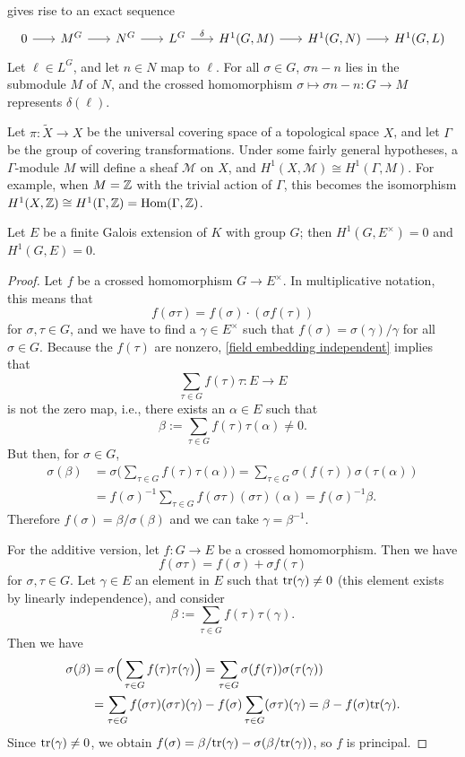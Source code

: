 gives rise to an exact sequence
\[\begin{tikzcd}[column sep=scriptsize]
0\ar[r]&M^G\ar[r]&N^G\ar[r]&L^G\ar[r,"\delta"]&H^1(G,M)\ar[r]&H^1(G,N)\ar[r]&H^1(G,L)
\end{tikzcd}\]
Let $\ell\in L^G$, and let $n\in N$ map to $\ell$. For all $\sigma\in G$, $\sigma n-n$ lies in the submodule $M$ of $N$, and the crossed homomorphism $\sigma\mapsto\sigma n-n:G\to M$ represents $\delta(\ell)$.
\begin{example}
Let $\pi:\widetilde{X}\to X$ be the universal covering space of a topological space $X$, and let $\Gamma$ be the group of covering transformations. Under some fairly general hypotheses, a $\Gamma$-module $M$ will define a sheaf $\mathcal{M}$ on $X$, and $H^1(X,\mathcal{M})\cong H^1(\Gamma,M)$. For example, when $M=\mathbb{Z}$ with the trivial action of $\Gamma$, this becomes the isomorphism $H^1(X,\mathbb{Z})\cong H^1(\Gamma,\mathbb{Z})=\mathrm{Hom}(\Gamma,\mathbb{Z})$.
\end{example}
\begin{theorem}\label{field ext H^1 is trivial}
Let $E$ be a finite Galois extension of $K$ with group $G$; then $H^1(G,E^{\times})=0$ and $H^1(G,E)=0$.
\end{theorem}
\begin{proof}
Let $f$ be a crossed homomorphism $G\to E^\times$. In multiplicative notation, this means that
\[f(\sigma\tau)=f(\sigma)\cdot (\sigma f(\tau))\]
for $\sigma,\tau\in G$, and we have to find a $\gamma\in E^\times$ such that $f(\sigma)=\sigma(\gamma)/\gamma$ for all $\sigma\in G$. Because the $f(\tau)$ are nonzero, \cref{field embedding independent} implies that
\[\sum_{\tau\in G}f(\tau)\tau:E\to E\]
is not the zero map, i.e., there exists an $\alpha\in E$ such that
\[\beta:=\sum_{\tau\in G}f(\tau)\tau(\alpha)\neq 0.\]
But then, for $\sigma\in G$,
\begin{align*}
\sigma(\beta)&=\sigma\Big(\sum_{\tau\in G}f(\tau)\tau(\alpha)\Big)=\sum_{\tau\in G}\sigma(f(\tau))\sigma(\tau(\alpha))\\
&=f(\sigma)^{-1}\sum_{\tau\in G}f(\sigma\tau)(\sigma\tau)(\alpha)=f(\sigma)^{-1}\beta.
\end{align*}
Therefore $f(\sigma)=\beta/\sigma(\beta)$ and we can take $\gamma=\beta^{-1}$.\par
For the additive version, let $f:G\to E$ be a crossed homomorphism. Then we have
\[f(\sigma\tau)=f(\sigma)+\sigma f(\tau)\]
for $\sigma,\tau\in G$. Let $\gamma\in E$ an element in $E$ such that $\mathrm{tr}(\gamma)\neq 0$ (this element exists by linearly independence), and consider
\[\beta:=\sum_{\tau\in G}f(\tau)\tau(\gamma).\]
Then we have
\begin{align*}
\sigma(\beta)&=\sigma\Big(\sum_{\tau\in G}f(\tau)\tau(\gamma)\Big)=\sum_{\tau\in G}\sigma(f(\tau))\sigma(\tau(\gamma))\\
&=\sum_{\tau\in G}f(\sigma\tau)(\sigma\tau)(\gamma)-f(\sigma)\sum_{\tau\in G}(\sigma\tau)(\gamma)=\beta-f(\sigma)\mathrm{tr}(\gamma).
\end{align*}
Since $\mathrm{tr}(\gamma)\neq 0$, we obtain $f(\sigma)=\beta/\mathrm{tr}(\gamma)-\sigma(\beta/\mathrm{tr}(\gamma))$, so $f$ is principal.
\end{proof}
